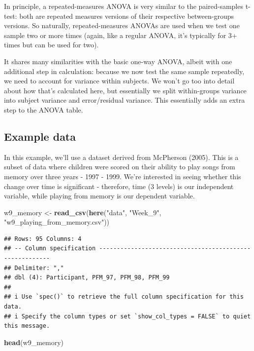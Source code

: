 \documentclass[
]{book}
\newenvironment{Shaded}{\begin{snugshade}}{\end{snugshade}}
\newcommand{\FunctionTok}[1]{\textcolor[rgb]{0.13,0.29,0.53}{\textbf{#1}}}
\newcommand{\NormalTok}[1]{#1}
\newcommand{\OtherTok}[1]{\textcolor[rgb]{0.56,0.35,0.01}{#1}}
\newcommand{\StringTok}[1]{\textcolor[rgb]{0.31,0.60,0.02}{#1}}
\begin{document}
In principle, a repeated-measures ANOVA is very similar to the paired-samples t-test: both are repeated measures versions of their respective between-groups versions. So naturally, repeated-measures ANOVAs are used when we test one sample two or more times (again, like a
regular ANOVA, it's typically for 3+ times but can be used for two).

It shares many similarities with the basic one-way ANOVA, albeit with one additional step in calculation: because we now test the same sample repeatedly, we need to account for variance within subjects. We won't go too into detail about how that's calculated here, but essentially we split within-groups variance into subject variance and error/residual variance. This essentially adds an extra step to the ANOVA table.

\subsection{Example data}\label{example-data-4}

In this example, we'll use a dataset derived from McPherson (2005). This is a subset of data where children were scored on their ability to play songs from memory over three years - 1997 - 1999. We're interested in seeing whether this change over time is significant - therefore, time (3 levels) is our independent variable, while playing from memory is our dependent variable.

\begin{Shaded}
\begin{Highlighting}[]
\NormalTok{w9\_memory }\OtherTok{\textless{}{-}} \FunctionTok{read\_csv}\NormalTok{(}\FunctionTok{here}\NormalTok{(}\StringTok{"data"}\NormalTok{, }\StringTok{"Week\_9"}\NormalTok{, }\StringTok{"w9\_playing\_from\_memory.csv"}\NormalTok{))}
\end{Highlighting}
\end{Shaded}

\begin{verbatim}
## Rows: 95 Columns: 4
## -- Column specification --------------------------------------------------------
## Delimiter: ","
## dbl (4): Participant, PFM_97, PFM_98, PFM_99
## 
## i Use `spec()` to retrieve the full column specification for this data.
## i Specify the column types or set `show_col_types = FALSE` to quiet this message.
\end{verbatim}

\begin{Shaded}
\begin{Highlighting}[]
\FunctionTok{head}\NormalTok{(w9\_memory)}
\end{Highlighting}
\end{Shaded}
\end{document}
